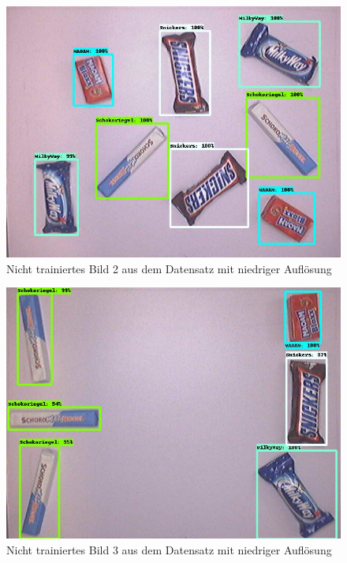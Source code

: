     \begin{figure}[H]
        \centering
        \includegraphics[angle = 90, width = \textwidth]{Bilder/models/model_comparison/ssd_mobilenet_v2_fpnlite_640x640_coco17_tpu-8/non_trained_2.jpg}
        \caption{Nicht trainiertes Bild 2 aus dem Datensatz mit niedriger Auflösung}
    \end{figure}
    
    \begin{figure}[H]
        \centering
        \includegraphics[angle = 90, width = \textwidth]{Bilder/models/model_comparison/ssd_mobilenet_v2_fpnlite_640x640_coco17_tpu-8/non_trained_3.jpg}
        \caption{Nicht trainiertes Bild 3 aus dem Datensatz mit niedriger Auflösung}
    \end{figure}
    
